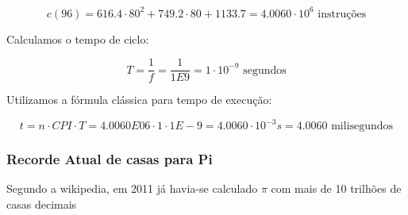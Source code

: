      \begin{equation}
     			c(96) = 616.4\cdot 80^2 + 749.2\cdot 80 +  1133.7 = 4.0060 \cdot 10^6\mbox{ instruções}
     \end{equation}
     
     Calculamos o tempo de ciclo:
     
     \begin{equation}
     	T = \frac{1}{f} = \frac{1}{1E9} = 1\cdot 10^{-9} \mbox{ segundos}
     \end{equation}
     
     Utilizamos a fórmula clássica para tempo de execução:
     
     \begin{equation}
     	t = n \cdot CPI \cdot T =  4.0060E06 \cdot 1 \cdot 1E-9 =  4.0060\cdot 10^{-3} s = 4.0060 \mbox{ milisegundos}
     \end{equation}
     
     \subsubsection{Recorde Atual de casas para Pi}
     
     Segundo a wikipedia, em 2011 já havia-se calculado $\pi$ com mais de 10 trilhões de casas decimais
     
     
     



